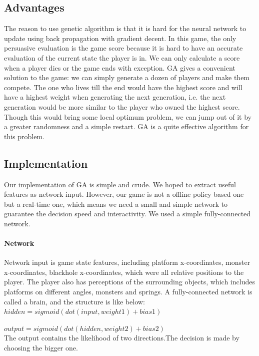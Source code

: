 \documentclass[final]{cvpr}
\begin{document}
\subsection{Advantages}
   The reason to use genetic algorithm is that it is hard for the neural network to update using back propagation with gradient decent. In this game, the only persuasive evaluation is the game score because it is hard to have an accurate evaluation of the current state the player is in. We can only calculate a score when a player dies or the game ends with exception. GA gives a convenient solution to the game: we can simply generate a dozen of players and make them compete. The one who lives till the end would have the highest score and will have a highest weight when generating the next generation, i.e. the next generation would be more similar to the player who owned the highest score. Though this would bring some local optimum problem, we can jump out of it by a greater randomness and a simple restart. GA is a quite effective algorithm for this problem.
   
\subsection{Implementation}
   Our implementation of GA is simple and crude. We hoped to extract useful features as network input. However, our game is not a offline policy based one but a real-time one, which means we need a small and simple network to guarantee the decision speed and interactivity. We used a simple fully-connected network.
\paragraph{Network}
   Network input is game state features, including platform x-coordinates, monster x-coordinates, blackhole x-coordinates, which were all relative positions to the player. The player also has perceptions of the surrounding objects, which includes platforms on different angles, monsters and springs. A fully-connected network is called a brain, and the structure is like below:\\

   $
   hidden=sigmoid(dot(input,weight1)+bias1)
   $

   $
   output=sigmoid(dot(hidden,weight2)+bias2)
   $\\
   
   The output contains the likelihood of two directions.The decision is made by choosing the bigger one. 
   
\end{document}
